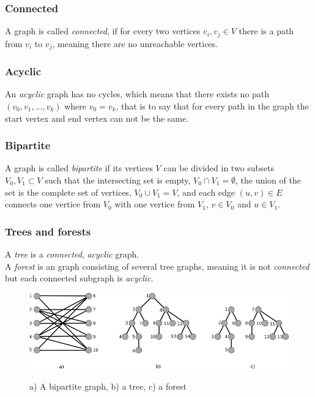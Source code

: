 \subsubsection{Connected}
A graph is called \textit{connected}, if for every two vertices $v_i, v_j \in V$ there is a path from $v_i$ to $v_j$, meaning there are no unreachable vertices.
\subsubsection{Acyclic}
An \textit{acyclic} graph has no cycles, which means that there exists no path $(v_0, v_1,...,v_k)$ where $v_0 = v_k$, that is to say that for every path in the graph the start vertex and end vertex can not be the same.
\subsubsection{Bipartite}
A graph is called \textit{bipartite} if its vertices $V$ can be divided in two subsets $V_0, V_1 \subset V$ such that the intersecting set is empty, $V_0 \cap V_1 = \emptyset$, the union of the set is the complete set of vertices, $V_0 \cup V_1 = V$, and each edge $(u,v) \in E$ connects one vertice from $V_0$ with one vertice from $V_1$, $v \in V_0$ and $u \in V_1$.
\subsubsection{Trees and forests}
A \textit{tree} is a \textit{connected}, \textit{acyclic} graph.\\
A \textit{forest} is an graph consisting of several tree graphs, meaning it is not \textit{connected} but each connected subgraph is \textit{acyclic}.
\begin{figure}[h!]
\includegraphics[width= \textwidth]{figures/BipartiteTreeForest.png}
\label{BTF}
\caption{a) A bipartite graph, b) a tree, c) a forest}
\end{figure}

